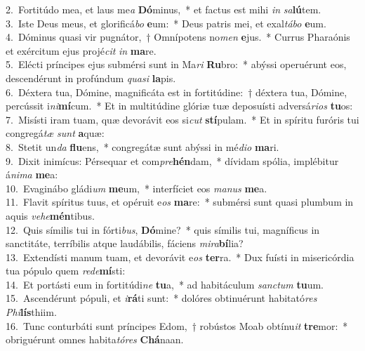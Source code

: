 {2.~}Fortitúdo mea, et laus me\textit{a} \textbf{Dó}minus,~* et factus est mihi \textit{in} \textit{sa}\textbf{lú}tem.\\
{3.~}Iste Deus meus, et glorificá\textit{bo} \textbf{e}um:~* Deus patris mei, et exal\textit{tá}\textit{bo} \textbf{e}um.\\
{4.~}Dóminus quasi vir pugnátor,~† Omnípotens no\textit{men} \textbf{e}jus.~* Currus Pharaónis et exércitum ejus projé\textit{cit} \textit{in} \textbf{ma}re.\\
{5.~}Elécti príncipes ejus submérsi sunt in Ma\textit{ri} \textbf{Ru}bro:~* abýssi operuérunt eos, descendérunt in profúndum \textit{qua}\textit{si} \textbf{la}pis.\\
{6.~}Déxtera tua, Dómine, magnificáta est in fortitúdine:~† déxtera tua, Dómine, percússit i\textit{ni}\textbf{mí}cum.~* Et in multitúdine glóriæ tuæ deposuísti adversá\textit{ri}\textit{os} \textbf{tu}os:\\
{7.~}Misísti iram tuam, quæ devorávit eos si\textit{cut} \textbf{stí}pulam.~* Et in spíritu furóris tui congregá\textit{tæ} \textit{sunt} \textbf{a}quæ:\\
{8.~}Stetit un\textit{da} \textbf{flu}ens,~* congregátæ sunt abýssi in mé\textit{di}\textit{o} \textbf{ma}ri.\\
{9.~}Dixit inimícus: Pérsequar et com\textit{pre}\textbf{hén}dam,~* dívidam spólia, implébitur á\textit{ni}\textit{ma} \textbf{me}a:\\
{10.~}Evaginábo gládi\textit{um} \textbf{me}um,~* interfíciet eos \textit{ma}\textit{nus} \textbf{me}a.\\
{11.~}Flavit spíritus tuus, et opéruit e\textit{os} \textbf{ma}re:~* submérsi sunt quasi plumbum in aquis \textit{ve}\textit{he}\textbf{mén}tibus.\\
{12.~}Quis símilis tui in fórti\textit{bus}, \textbf{Dó}mine?~* quis símilis tui, magníficus in sanctitáte, terríbilis atque laudábilis, fáciens \textit{mi}\textit{ra}\textbf{bí}lia?\\
{13.~}Extendísti manum tuam, et devorávit e\textit{os} \textbf{ter}ra.~* Dux fuísti in misericórdia tua pópulo quem \textit{re}\textit{de}\textbf{mí}sti:\\
{14.~}Et portásti eum in fortitúdi\textit{ne} \textbf{tu}a,~* ad habitáculum \textit{san}\textit{ctum} \textbf{tu}um.\\
{15.~}Ascendérunt pópuli, et \textit{i}\textbf{rá}ti sunt:~* dolóres obtinuérunt habitató\textit{res} \textit{Phi}\textbf{lís}thiim.\\
{16.~}Tunc conturbáti sunt príncipes Edom,~† robústos Moab obtínu\textit{it} \textbf{tre}mor:~* obriguérunt omnes habita\textit{tó}\textit{res} \textbf{Chá}naan.\\
